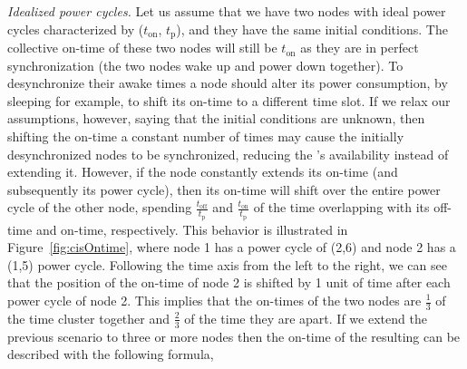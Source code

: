 \noindent\textit{Idealized power cycles.}
Let us assume that we have two nodes with ideal power cycles characterized by ($t_\text{on}$, $t_\text{p}$), and they have the same initial conditions. The collective on-time of these two nodes will still be $t_\text{on}$ as they are in perfect synchronization (the two nodes wake up and power down together). 
% 
To desynchronize their awake times a node should alter its power consumption, by sleeping for example, to shift its on-time to a different time slot. 
If we relax our assumptions, however, saying that the initial conditions are unknown, then shifting the on-time a constant number of times may cause the initially desynchronized nodes to be synchronized, reducing the \sys's availability instead of extending it.  However, if the node constantly extends its on-time (and subsequently its power cycle), then its on-time will shift over the entire power cycle of the other node, spending 
$\frac{ t_\text{off} }{t_\text{p}}$ and $\frac{ t_\text{on} }{t_\text{p}}$ of the time overlapping with its off-time and on-time, respectively. 
 This behavior is illustrated in Figure~\ref{fig:cisOntime}, where node 1 has a power cycle of (2,6) and node 2 has a (1,5) power cycle.
Following the time axis from the left to the right, we can see that the position of the on-time of node 2 is shifted by 1 unit of time after each power cycle of node 2. This implies that the on-times of the two nodes are $\frac{1}{3}$ of the time cluster together and $\frac{2}{3}$ of the time they are apart. If we extend the previous scenario to three or more nodes then the on-time of the resulting \sys can be described with the following formula,
				

